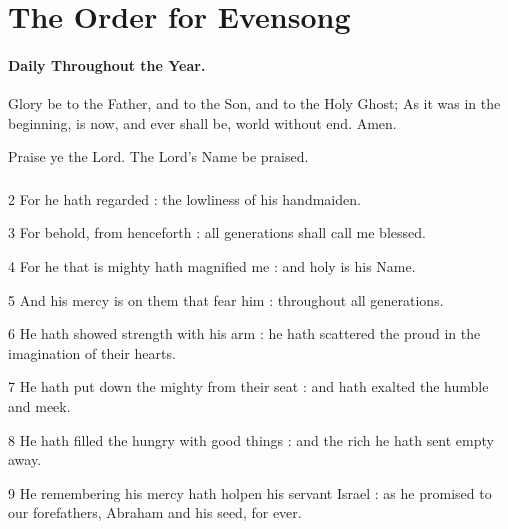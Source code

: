 \chapter{The Order for Evensong}
\subsubsection{Daily Throughout the Year.}



\V Glory be to the Father, and to the Son, and to the Holy Ghost;  \R As it was in the beginning, is now, and ever shall be, world without end. Amen.

\V Praise ye the Lord.  \R The Lord's Name be praised.


\subsection{}


2 For he hath regarded : the lowliness of his handmaiden.

3 For behold, from henceforth : all generations shall call me blessed.

4 For he that is mighty hath magnified me : and holy is his Name.

5 And his mercy is on them that fear him : throughout all generations.

6 He hath showed strength with his arm : he hath scattered the proud in the imagination of their hearts.

7 He hath put down the mighty from their seat : and hath exalted the humble and meek.

8 He hath filled the hungry with good things : and the rich he hath sent empty away.

9 He remembering his mercy hath holpen his servant Israel : as he promised to our forefathers, Abraham and his seed, for ever.


